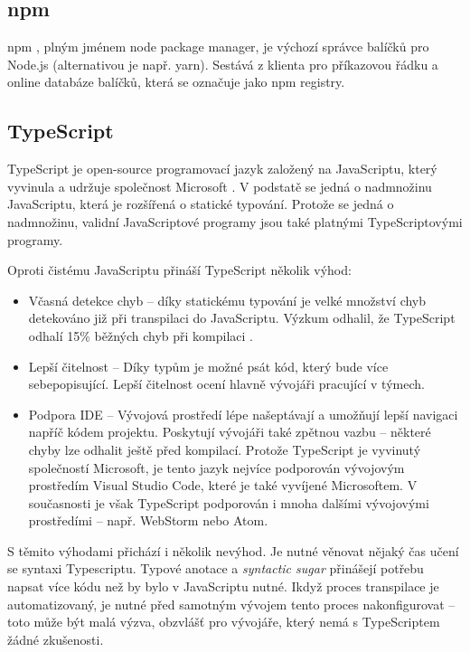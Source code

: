 \documentclass[thesis=M,czech]{FITthesis}[2019/12/23]
\begin{document}
\subsection{npm}
npm \cite{npm}, plným jménem node package manager, je výchozí správce balíčků pro Node.js (alternativou je např. yarn\cite{yarn}). Sestává z klienta pro příkazovou řádku a online databáze balíčků, která se označuje jako npm registry.

\subsection{TypeScript}
TypeScript je open-source programovací jazyk založený na JavaScriptu, který vyvinula a udržuje společnost Microsoft \cite{typescript}. V podstatě se jedná o nadmnožinu JavaScriptu, která je rozšířená o statické typování. Protože se jedná o nadmnožinu, validní JavaScriptové programy jsou také platnými TypeScriptovými programy.

Oproti čistému JavaScriptu přináší TypeScript několik výhod:

\begin{itemize}
  \item Včasná detekce chyb -- díky statickému typování je velké množství chyb detekováno již při transpilaci do JavaScriptu. Výzkum odhalil, že TypeScript odhalí 15\% běžných chyb při kompilaci \cite{typescript_bugs}.
  \item Lepší čitelnost -- Díky typům je možné psát kód, který bude více sebepopisující. Lepší čitelnost ocení hlavně vývojáři pracující v týmech.
  \item Podpora IDE -- Vývojová prostředí lépe našeptávají a umožňují lepší navigaci napříč kódem projektu. Poskytují vývojáři také zpětnou vazbu -- některé chyby lze odhalit ještě před kompilací. Protože TypeScript je vyvinutý společností Microsoft, je tento jazyk nejvíce podporován vývojovým prostředím Visual Studio Code, které je také vyvíjené Microsoftem. V současnosti je však TypeScript podporován i mnoha dalšími vývojovými prostředími -- např. WebStorm nebo Atom.
\end{itemize}

S těmito výhodami přichází i několik nevýhod. Je nutné věnovat nějaký čas učení se syntaxi Typescriptu. Typové anotace a \textit{syntactic sugar} přinášejí potřebu napsat více kódu než by bylo v JavaScriptu nutné. Ikdyž proces transpilace je automatizovaný, je nutné před samotným vývojem tento proces nakonfigurovat -- toto může být malá výzva, obzvlášť pro vývojáře, který nemá s TypeScriptem žádné zkušenosti.
\end{document}
